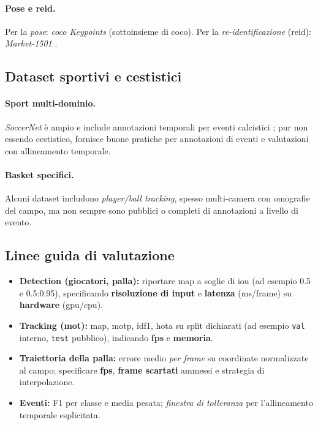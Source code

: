 \documentclass[12pt,a4paper,openright,twoside]{book}
\begin{document}
\paragraph{Pose e \ac{reid}.} Per la \emph{pose}: \textit{\ac{coco} Keypoints} (sottoinsieme di \ac{coco}). 
Per la \emph{re-identificazione} (\ac{reid}): \textit{Market-1501} \cite{zheng2015scalable}.


\subsection{Dataset sportivi e cestistici}

\paragraph{Sport multi-dominio.} \textit{SoccerNet} è ampio e include annotazioni temporali per eventi calcistici 
\cite{giancola2018soccernet}; pur non essendo cestistico, fornisce buone pratiche per annotazioni di eventi e valutazioni con 
allineamento temporale. 

\paragraph{Basket specifici.} Alcuni dataset includono \emph{player/ball tracking}, spesso multi-camera con omografie del campo, 
ma non sempre sono pubblici o completi di annotazioni a livello di evento. 


\subsection{Linee guida di valutazione}

\begin{itemize}
  \item \textbf{Detection (giocatori, palla):} riportare \ac{map} a soglie di 
  \ac{iou} (ad esempio 0.5 e 0.5:0.95), specificando \textbf{risoluzione di input} e \textbf{latenza} (ms/frame) su \textbf{hardware} (\ac{gpu}/\ac{cpu}).
  \item \textbf{Tracking (\ac{mot}):} \ac{map}, \ac{motp}, \ac{idf1}, \ac{hota} su split 
  dichiarati (ad esempio \texttt{val} interno, \texttt{test} pubblico), indicando \textbf{\ac{fps}} e \textbf{memoria}.
  \item \textbf{Traiettoria della palla:} errore medio \emph{per frame} su coordinate normalizzate al campo; specificare \textbf{\ac{fps}},
  \textbf{frame scartati} ammessi e strategia di interpolazione.
\item \textbf{Eventi:} F1 per classe e media pesata; \emph{finestra di tolleranza} per l'allineamento temporale esplicitata.
\end{itemize}
\end{document}
